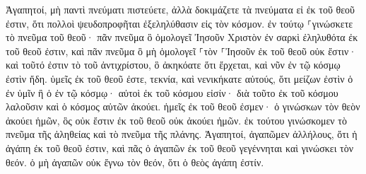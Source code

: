 \documentclass{openreader}
\begin{document}
Ἀγαπητοί, μὴ παντὶ πνεύματι πιστεύετε, ἀλλὰ δοκιμάζετε τὰ πνεύματα εἰ ἐκ τοῦ θεοῦ ἐστιν, ὅτι πολλοὶ ψευδοπροφῆται ἐξεληλύθασιν εἰς τὸν κόσμον. 
ἐν τούτῳ ⸀γινώσκετε τὸ πνεῦμα τοῦ θεοῦ· πᾶν πνεῦμα ὃ ὁμολογεῖ Ἰησοῦν Χριστὸν ἐν σαρκὶ ἐληλυθότα ἐκ τοῦ θεοῦ ἐστιν, 
καὶ πᾶν πνεῦμα ὃ μὴ ὁμολογεῖ ⸀τὸν ⸀Ἰησοῦν ἐκ τοῦ θεοῦ οὐκ ἔστιν· καὶ τοῦτό ἐστιν τὸ τοῦ ἀντιχρίστου, ὃ ἀκηκόατε ὅτι ἔρχεται, καὶ νῦν ἐν τῷ κόσμῳ ἐστὶν ἤδη. 
ὑμεῖς ἐκ τοῦ θεοῦ ἐστε, τεκνία, καὶ νενικήκατε αὐτούς, ὅτι μείζων ἐστὶν ὁ ἐν ὑμῖν ἢ ὁ ἐν τῷ κόσμῳ· 
αὐτοὶ ἐκ τοῦ κόσμου εἰσίν· διὰ τοῦτο ἐκ τοῦ κόσμου λαλοῦσιν καὶ ὁ κόσμος αὐτῶν ἀκούει. 
ἡμεῖς ἐκ τοῦ θεοῦ ἐσμεν· ὁ γινώσκων τὸν θεὸν ἀκούει ἡμῶν, ὃς οὐκ ἔστιν ἐκ τοῦ θεοῦ οὐκ ἀκούει ἡμῶν. ἐκ τούτου γινώσκομεν τὸ πνεῦμα τῆς ἀληθείας καὶ τὸ πνεῦμα τῆς πλάνης. 
Ἀγαπητοί, ἀγαπῶμεν ἀλλήλους, ὅτι ἡ ἀγάπη ἐκ τοῦ θεοῦ ἐστιν, καὶ πᾶς ὁ ἀγαπῶν ἐκ τοῦ θεοῦ γεγέννηται καὶ γινώσκει τὸν θεόν. 
ὁ μὴ ἀγαπῶν οὐκ ἔγνω τὸν θεόν, ὅτι ὁ θεὸς ἀγάπη ἐστίν. 
\end{document}
